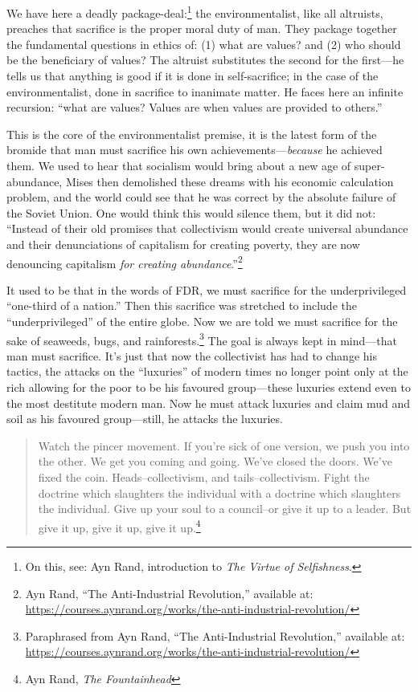 \documentclass[11pt]{article}
\begin{document}
We have here a deadly package-deal:\footnote{On this, see: Ayn Rand, introduction to \emph{The Virtue of Selfishness}.} the environmentalist, like all altruists, preaches that sacrifice is the proper moral duty of man. They package together the fundamental questions in ethics of: (1) what are values? and (2) who should be the beneficiary of values? The altruist substitutes the second for the first---he tells us that anything is good if it is done in self-sacrifice; in the case of the environmentalist, done in sacrifice to inanimate matter. He faces here an infinite recursion: ``what are values? Values are when values are provided to others.''

This is the core of the environmentalist premise, it is the latest form of the bromide that man must sacrifice his own achievements---​\emph{because} he achieved them. We used to hear that socialism would bring about a new age of super-abundance, Mises then demolished these dreams with his economic calculation problem, and the world could see that he was correct by the absolute failure of the Soviet Union. One would think this would silence them, but it did not: ``Instead of their old promises that collectivism would create universal abundance and their denunciations of capitalism for creating poverty, they are now denouncing capitalism \emph{for creating abundance}.''\footnote{Ayn Rand, ``The Anti-Industrial Revolution,'' available at: \url{https://courses.aynrand.org/works/the-anti-industrial-revolution/}}

It used to be that in the words of FDR, we must sacrifice for the underprivileged ``one-third of a nation.'' Then this sacrifice was stretched to include the ``underprivileged'' of the entire globe. Now we are told we must sacrifice for the sake of seaweeds, bugs, and rainforests.\footnote{Paraphrased from Ayn Rand, ``The Anti-Industrial Revolution,'' available at: \url{https://courses.aynrand.org/works/the-anti-industrial-revolution/}} The goal is always kept in mind---that man must sacrifice. It's just that now the collectivist has had to change his tactics, the attacks on the ``luxuries'' of modern times no longer point only at the rich allowing for the poor to be his favoured group---these luxuries extend even to the most destitute modern man. Now he must attack luxuries and claim mud and soil as his favoured group---still, he attacks the luxuries.

\begin{quote}
Watch the pincer movement. If you’re sick of one version, we push you into the other. We get you coming and going. We’ve closed the doors. We’ve fixed the coin. Heads--collectivism, and tails--collectivism. Fight the doctrine which slaughters the individual with a doctrine which slaughters the individual. Give up your soul to a council--or give it up to a leader. But give it up, give it up, give it up.\footnote{Ayn Rand, \emph{The Fountainhead}}
\end{quote}
\end{document}
